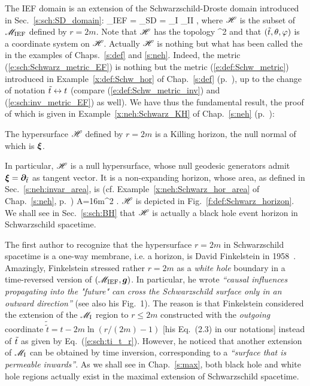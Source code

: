The IEF domain is an extension of the Schwarzschild-Droste domain
introduced in Sec.~\ref{s:sch:SD_domain}:
\be
    \M_{\rm IEF} = \M_{\rm SD} \cup \Hor = \M_{\rm I} \cup \M_{\rm II} \cup \Hor ,
\ee
where $\mathscr{H}$ is the subset of $\mathscr{M}_{\rm IEF}$ defined by $r=2m$. Note that
$\mathscr{H}$ has the topology
\be
    \Hor \simeq \R\times\SS^2
\ee
and that $({\tilde t},\theta,\varphi)$ is a coordinate system on $\mathscr{H}$.
Actually $\mathscr{H}$ is nothing but what has been called the
 in the examples
of Chaps.~\ref{s:def} and \ref{s:neh}. Indeed, the metric
(\ref{e:sch:Schwarz_metric_EF}) is nothing but
the metric (\ref{e:def:Schw_metric}) introduced in Example~\ref{x:def:Schw_hor}
of Chap.~\ref{s:def} (p.~\pageref{x:def:Schw_hor}), up to the change of notation ${\tilde t} \leftrightarrow t$ (compare (\ref{e:def:Schw_metric_inv}) and
(\ref{e:sch:inv_metric_EF}) as well).
We have thus the fundamental result,
the proof of which is given in Example~\ref{x:neh:Schwarz_KH} of Chap.~\ref{s:neh}
(p.~\pageref{x:neh:Schwarz_KH}):
\begin{prop}
The hypersurface $\mathscr{H}$ defined by $r=2m$
is a Killing horizon, the null normal of which is $\bm{\xi}$.
\end{prop}
In particular, $\mathscr{H}$ is a null hypersurface, whose null geodesic generators
admit $\bm{\xi} = \bm{\partial}_{{\tilde t}}$ as tangent vector. It is a non-expanding horizon,
whose area, as defined in Sec.~\ref{s:neh:invar_area}, is (cf. Example~\ref{x:neh:Schwarz_hor_area} of Chap.~\ref{s:neh}, p.~\pageref{x:neh:Schwarz_hor_area})
\be
    A=16\pi m^2 .
\ee
$\mathscr{H}$ is depicted in Fig.~\ref{f:def:Schwarz_horizon}.
We shall see in Sec.~\ref{s:sch:BH} that $\mathscr{H}$ is actually a
black hole event horizon in Schwarzschild spacetime.

\begin{hist}
The first author to recognize that the hypersurface $r=2m$ in Schwarzschild spacetime
is a one-way membrane, i.e. a horizon, is David Finkelstein
in 1958~\cite{Finke58}. Amazingly, Finkelstein stressed rather $r=2m$
as a \emph{white hole} boundary in a time-reversed version of $(\mathscr{M}_{\rm IEF},\bm{g})$. In particular, he
wrote \emph{``causal influences propagating into the "future" can cross the Schwarzschild surface only
in an outward direction''} (see also his Fig.~1). The reason is that Finkelstein considered
the extension of the $\mathscr{M}_{\rm I}$ region to $r\leq 2m$ constructed with
the \emph{outgoing}
coordinate $\tilde{\tilde t} = t - 2 m \ln ( {r}/(2m) - 1 )$ [his Eq.~(2.3) in our notations] instead of ${\tilde t}$ as given by Eq.~(\ref{e:sch:ti_t_r}). However, he noticed that another
extension of $\mathscr{M}_{\rm I}$ can be obtained by time inversion,
corresponding to a \emph{``surface that is permeable inwards''}. As we shall see in Chap.~\ref{s:max},
both black hole and white hole regions actually exist in the maximal extension
of Schwarzschild spacetime.
\end{hist}


